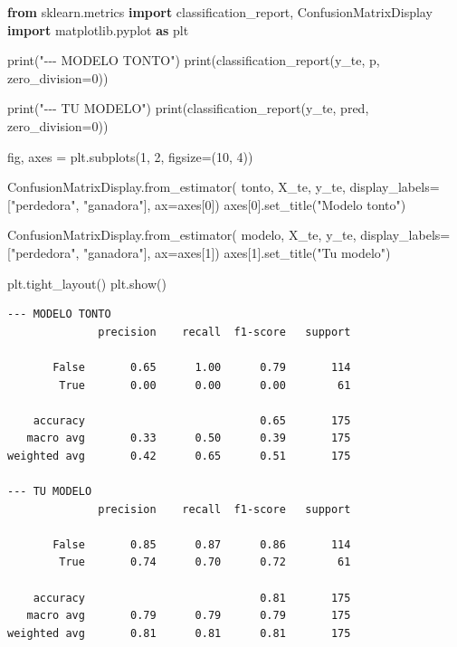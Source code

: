 \documentclass[
]{article}
\newenvironment{Shaded}{}{}
\newcommand{\BuiltInTok}[1]{\textcolor[rgb]{0.00,0.50,0.00}{#1}}
\newcommand{\DecValTok}[1]{\textcolor[rgb]{0.25,0.63,0.44}{#1}}
\newcommand{\ImportTok}[1]{\textcolor[rgb]{0.00,0.50,0.00}{\textbf{#1}}}
\newcommand{\NormalTok}[1]{#1}
\newcommand{\OperatorTok}[1]{\textcolor[rgb]{0.40,0.40,0.40}{#1}}
\newcommand{\StringTok}[1]{\textcolor[rgb]{0.25,0.44,0.63}{#1}}
\begin{document}
\protect{}\label{8Vv7XwwqnYyW}
\begin{Shaded}
\begin{Highlighting}[]
\ImportTok{from}\NormalTok{ sklearn.metrics }\ImportTok{import}\NormalTok{ classification\_report, ConfusionMatrixDisplay}
\ImportTok{import}\NormalTok{ matplotlib.pyplot }\ImportTok{as}\NormalTok{ plt}

\BuiltInTok{print}\NormalTok{(}\StringTok{"{-}{-}{-} MODELO TONTO"}\NormalTok{)}
\BuiltInTok{print}\NormalTok{(classification\_report(y\_te, p, zero\_division}\OperatorTok{=}\DecValTok{0}\NormalTok{))}

\BuiltInTok{print}\NormalTok{(}\StringTok{"{-}{-}{-} TU MODELO"}\NormalTok{)}
\BuiltInTok{print}\NormalTok{(classification\_report(y\_te, pred, zero\_division}\OperatorTok{=}\DecValTok{0}\NormalTok{))}

\NormalTok{fig, axes }\OperatorTok{=}\NormalTok{ plt.subplots(}\DecValTok{1}\NormalTok{, }\DecValTok{2}\NormalTok{, figsize}\OperatorTok{=}\NormalTok{(}\DecValTok{10}\NormalTok{, }\DecValTok{4}\NormalTok{))}

\NormalTok{ConfusionMatrixDisplay.from\_estimator(}
\NormalTok{    tonto, X\_te, y\_te, display\_labels}\OperatorTok{=}\NormalTok{[}\StringTok{"perdedora"}\NormalTok{, }\StringTok{"ganadora"}\NormalTok{], ax}\OperatorTok{=}\NormalTok{axes[}\DecValTok{0}\NormalTok{])}
\NormalTok{axes[}\DecValTok{0}\NormalTok{].set\_title(}\StringTok{"Modelo tonto"}\NormalTok{)}

\NormalTok{ConfusionMatrixDisplay.from\_estimator(}
\NormalTok{    modelo, X\_te, y\_te, display\_labels}\OperatorTok{=}\NormalTok{[}\StringTok{"perdedora"}\NormalTok{, }\StringTok{"ganadora"}\NormalTok{], ax}\OperatorTok{=}\NormalTok{axes[}\DecValTok{1}\NormalTok{])}
\NormalTok{axes[}\DecValTok{1}\NormalTok{].set\_title(}\StringTok{"Tu modelo"}\NormalTok{)}

\NormalTok{plt.tight\_layout()}
\NormalTok{plt.show()}
\end{Highlighting}
\end{Shaded}

\begin{verbatim}
--- MODELO TONTO
              precision    recall  f1-score   support

       False       0.65      1.00      0.79       114
        True       0.00      0.00      0.00        61

    accuracy                           0.65       175
   macro avg       0.33      0.50      0.39       175
weighted avg       0.42      0.65      0.51       175

--- TU MODELO
              precision    recall  f1-score   support

       False       0.85      0.87      0.86       114
        True       0.74      0.70      0.72        61

    accuracy                           0.81       175
   macro avg       0.79      0.79      0.79       175
weighted avg       0.81      0.81      0.81       175

\end{verbatim}
\end{document}

